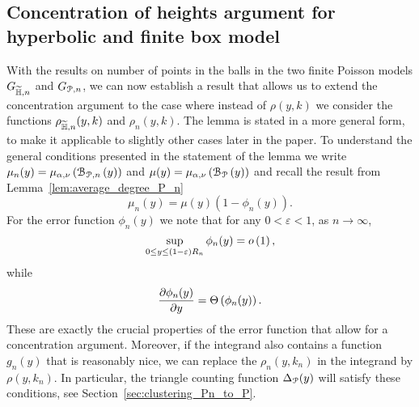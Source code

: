 \subsection{Concentration of heights argument for hyperbolic and finite box model}

With the results on number of points in the balls in the two finite Poisson models $G_{\widetilde{\mathbb{H}},n}$ and $G_{{\mathcal P},n}$, we can now establish a result that allows us to extend the concentration argument to the case where instead of $\rho(y,k)$ we consider the functions $\rho_{\widetilde{\mathbb{H}},n}(y,k)$ and $\rho_{n}(y,k)$. The lemma is stated in a more general form, to make it applicable to slightly other cases later in the paper. To understand the general conditions presented in the statement of the lemma we write $\mu_n(y) = \mu_{\alpha,\nu}\left({\mathcal B}_{{\mathcal P},n}\left(y\right)\right)$ and $\mu(y) = \mu_{\alpha,\nu}\left({\mathcal B}_{{\mathcal P}}\left(y\right)\right)$ and recall the result from Lemma~\ref{lem:average_degree_P_n}
\[
	\mu_n(y) = \mu(y)(1 - \phi_n(y)).
\]
For the error function $\phi_n(y)$ we note that for any $0 < \varepsilon < 1$, as $n \to \infty$, 
\[
	\sup_{0 \le y \le (1-\varepsilon)R_n} \phi_n(y) = o\left(1\right),
\]
while
\[
	\frac{\partial \phi_n(y)}{\partial y} = \Theta\left(\phi_n(y)\right).
\]
These are exactly the crucial properties of the error function that allow for a concentration argument. Moreover, if the integrand also contains a function $g_n(y)$ that is reasonably nice, we can replace the $\rho_{n}(y,k_n)$ in the integrand by $\rho(y,k_n)$. In particular, the triangle counting function $\Delta_{{\mathcal P}}(y)$ will satisfy these conditions, see Section~\ref{sec:clustering_Pn_to_P}.

